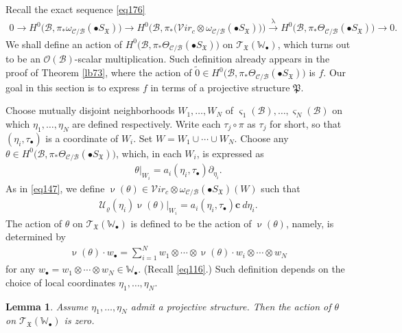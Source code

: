 \documentclass[12pt,a4paper,notitlepage]{report}
\theoremstyle{definition}
\theoremstyle{plain}
\newtheorem{lm}[df]{Lemma}
\newcommand{\fk}{\mathfrak}
\newcommand{\mc}{\mathcal}
\newcommand{\wtd}{\widetilde}
\newcommand{\scr}{\mathscr}
\newcommand{\sgm}{\varsigma}
\newcommand{\blt}{\bullet}
\newcommand{\Wbb}{\mathbb W}
\newcommand{\cbf}{\mathbf c}
\newcommand{\svir}{\mathcal V\!\mathit{ir}}
\numberwithin{equation}{section}
\begin{document}
Recall the exact sequence \eqref{eq176}
\begin{align*}
0\rightarrow H^0\big(\mc B,\pi_*\omega_{\mc C/\mc B}(\blt S_{\fk X})\big) \rightarrow  H^0\big(\mc B,\pi_*\big(\svir_c\otimes \omega_{\mc C/\mc B}(\blt S_{\fk X})\big)\big)\xrightarrow{\uplambda}  H^0\big(\mc B,\pi_*\Theta_{\mc C/\mc B}(\blt S_{\fk X})\big)\rightarrow 0.
\end{align*}
We shall define an action of $H^0\big(\mc B,\pi_*\Theta_{\mc C/\mc B}(\blt S_{\fk X})\big)$ on $\scr T_{\fk X}(\Wbb_\blt)$, which turns out to be an $\scr O(\mc B)$-scalar multiplication. Such definition already appears in the proof of Theorem \ref{lb73}, where the action of $\wtd 0\in H^0\big(\mc B,\pi_*\Theta_{\mc C/\mc B}(\blt S_{\fk X})\big)$ is $f$. Our goal in this section is to express $f$ in terms of a projective structure $\fk P$.

Choose mutually disjoint neighborhoods $W_1,\dots,W_N$ of $\sgm_1(\mc B),\dots,\sgm_N(\mc B)$ on which $\eta_1,\dots,\eta_N$ are defined respectively. Write each $\tau_j\circ\pi$ as $\tau_j$ for short, so that $(\eta_i,\tau_\blt)$ is a coordinate of $W_i$. Set $W=W_1\cup\cdots\cup W_N$. Choose any $\theta\in H^0\big(\mc B,\pi_*\Theta_{\mc C/\mc B}(\blt S_{\fk X})\big)$, which, in each $W_i$, is expressed as
\begin{align}
\theta|_{W_i}=a_i(\eta_i,\tau_\blt)\partial_{\eta_i}.\label{eq177}
\end{align}
As in \eqref{eq147}, we define $\upnu(\theta)\in \svir_c\otimes \omega_{\mc C/\mc B}(\blt S_{\fk X})(W)$ such that
\begin{align}
\mc U_\varrho(\eta_i)\upnu(\theta)|_{W_i}=a_i(\eta_i,\tau_\blt)\cbf~d{\eta_i}.\label{eq178}
\end{align}
The action of $\theta$ on $\scr T_{\fk X}(\Wbb_\blt)$ is defined to be the action of $\upnu(\theta)$, namely, is determined by
\begin{align}
\upnu(\theta)\cdot w_\blt=\sum_{i=1}^N w_1\otimes\cdots\otimes \upnu(\theta)\cdot w_i\otimes\cdots \otimes w_N
\end{align}
for any $w_\blt=w_1\otimes\cdots\otimes w_N\in\Wbb_\blt$. (Recall \eqref{eq116}.) Such definition depends on the choice of local coordinates $\eta_1,\dots,\eta_N$.



\begin{lm}\label{lb74}
Assume $\eta_1,\dots,\eta_N$ admit a projective structure. Then the action of $\theta$ on $\scr T_{\fk X}(\Wbb_\blt)$ is zero.
\end{lm}
\end{document}
